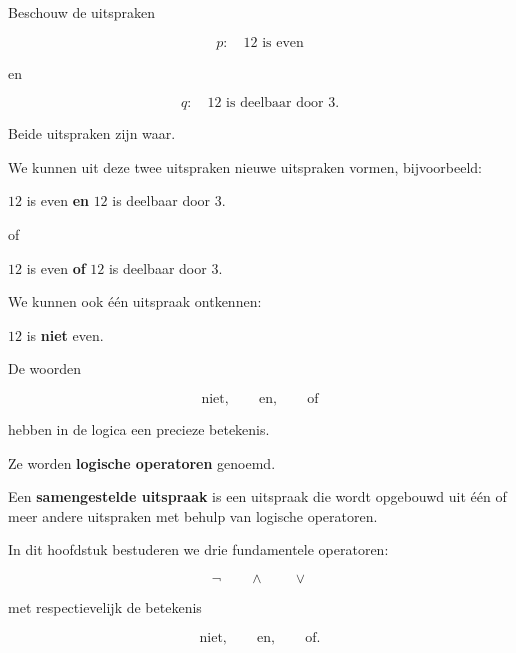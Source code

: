 \documentclass{ximera}
\begin{document}

  Beschouw de uitspraken

  \[
  p:\quad 12\text{ is even}
  \]

  en

  \[
  q:\quad 12\text{ is deelbaar door }3.
  \]

  Beide uitspraken zijn waar.

  We kunnen uit deze twee uitspraken nieuwe uitspraken vormen, bijvoorbeeld:

  \begin{center}
  $12$ is even \textbf{en} $12$ is deelbaar door $3$.
  \end{center}

  of

  \begin{center}
  $12$ is even \textbf{of} $12$ is deelbaar door $3$.
  \end{center}

  We kunnen ook één uitspraak ontkennen:

  \begin{center}
  $12$ is \textbf{niet} even.
  \end{center}

  De woorden

  \[
  \text{niet},\qquad \text{en},\qquad \text{of}
  \]

  hebben in de logica een precieze betekenis.

  Ze worden \textbf{logische operatoren} genoemd.


  \begin{definitie}
  Een \textbf{samengestelde uitspraak} is een uitspraak die wordt opgebouwd
  uit één of meer andere uitspraken met behulp van logische operatoren.
  \end{definitie}


  In dit hoofdstuk bestuderen we drie fundamentele operatoren:

  \[
  \neg \qquad \land \qquad \lor
  \]

  met respectievelijk de betekenis

  \[
  \text{niet},\qquad \text{en},\qquad \text{of}.
  \]


\end{document}
